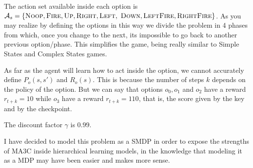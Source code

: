 The action set available inside each option is
$\mathcal{A}_s = \{\textsc{Noop}, \textsc{Fire}, \textsc{Up}, \textsc{Right}, \textsc{Left},$
$\textsc{Down}, \textsc{LeftFire}, \textsc{RightFire}\}$.
As you may realize by defining the options in this way we divide the problem in 4 phases from which, once
you change to the next, its impossible to go back to another previous option/phase.
This simplifies the game, being really similar to Simple States and Complex States games.

As far as the agent will learn how to act inside the option, we cannot accurately define $ P_o(s,s') $ and $ R_o(s) $.
This is because the number of steps $k$ depends on the policy of the option.
But we can say that options $o_0, o_1$ and $o_2$ have a reward $r_{t+k} = 10$ while $o_3$ have a reward $r_{t+k} = 110$,
that is, the score given by the key and by the checkpoint.

The discount factor $\gamma$ is $0.99$.

I have decided to model this problem as a \ac{SMDP} in order to expose the strengths of \ac{MA3C} inside hierarchical
learning models, in the knowledge that modeling it as a \ac{MDP} may have been easier and makes more sense.


